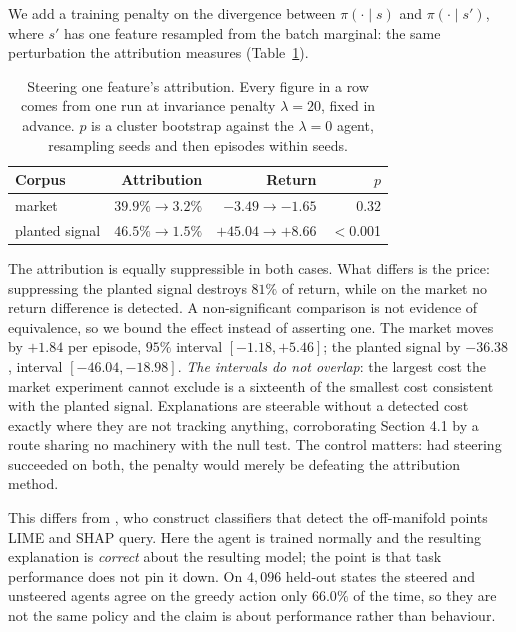 \documentclass[10pt,twocolumn]{article}
\begin{document}
We add a training penalty on the divergence between $\pi(\cdot\mid s)$ and
$\pi(\cdot\mid s')$, where $s'$ has one feature resampled from the batch
marginal: the same perturbation the attribution measures
(Table~\ref{tab:steer}).

\begin{table}[t]
\centering\small
\caption{Steering one feature's attribution. Every figure in a row comes from one run at invariance penalty $\lambda=20$, fixed in advance. $p$ is a cluster bootstrap against the $\lambda=0$ agent, resampling seeds and then episodes within seeds.}
\label{tab:steer}
\begin{tabular}{lrrr}
\toprule
Corpus & Attribution & Return & $p$ \\
\midrule
market & $39.9\% \to \mathbf{3.2\%}$ & $-3.49 \to -1.65$ & $\mathbf{0.32}$ \\
planted signal & $46.5\% \to \mathbf{1.5\%}$ & $+45.04 \to \mathbf{+8.66}$ & $<$0.001 \\
\bottomrule
\end{tabular}
\end{table}


The attribution is equally suppressible in both cases. What differs is the price:
suppressing the planted signal destroys $81\%$ of return, while on the market no
return difference is detected. A non-significant comparison is not evidence of
equivalence, so we bound the effect instead of asserting one. The market moves
by $+1.84$ per episode, $95\%$ interval $[-1.18, +5.46]$; the planted signal by
$-36.38$, interval $[-46.04, -18.98]$. \emph{The intervals do not overlap}: the
largest cost the market experiment cannot exclude is a sixteenth of the smallest
cost consistent with the planted signal. Explanations are steerable without a
detected cost exactly where they are not tracking anything, corroborating
Section 4.1 by a route sharing no machinery with the null test. The control matters: had steering succeeded on both, the
penalty would merely be defeating the attribution method.

This differs from \citet{slack2020fooling}, who construct classifiers that detect
the off-manifold points LIME and SHAP query. Here the agent is trained normally
and the resulting explanation is \emph{correct} about the resulting model; the
point is that task performance does not pin it down. On $4{,}096$ held-out
states the steered and unsteered agents agree on the greedy action only
$66.0\%$ of the time, so they are not the same policy and the claim is about
performance rather than behaviour.
\end{document}
